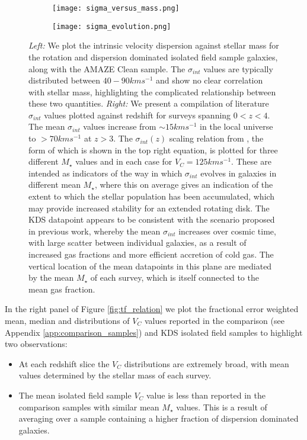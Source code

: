 \documentclass[fleqn,usenatbib]{mn2e}
\begin{document}
\begin{figure*}
    \centering \hspace{-1.3cm}
    \begin{subfigure}[h!]{0.5\textwidth}
        \centering
        \texttt{[image: sigma\_versus\_mass.png]}
    \end{subfigure} \hspace{0.4cm}
    \begin{subfigure}[h!]{0.5\textwidth}
        \centering
        \texttt{[image: sigma\_evolution.png]}
    \end{subfigure}
    \caption{{\it Left:} We plot the intrinsic velocity dispersion against stellar mass for the rotation and dispersion dominated isolated field sample galaxies, along with the AMAZE Clean sample.
    The $\sigma_{int}$ values are typically distributed between $40-90kms^{-1}$ and show no clear correlation with stellar mass, highlighting the complicated relationship between these two quantities. 
    {\it Right:} We present a compilation of literature $\sigma_{int}$ values plotted against redshift for surveys spanning $0 < z < 4$.
    The mean $\sigma_{int}$ values increase from $\sim 15kms^{-1}$ in the local universe to $> 70kms^{-1}$ at $z > 3$.
    The $\sigma_{int}(z)$ scaling relation from \protect\cite{Wisnioski2015}, the form of which is shown in the top right equation, is plotted for three different $M_{\star}$ values and in each case for $V_{C} = 125kms^{-1}$.
    These are intended as indicators of the way in which $\sigma_{int}$ evolves in galaxies in different mean $M_{\star}$, where this on average gives an indication of the extent to which the stellar population has been accumulated, which may provide increased stability for an extended rotating disk.
    The KDS datapoint appears to be consistent with the scenario proposed in previous work, whereby the mean $\sigma_{int}$ increases over cosmic time, with large scatter between individual galaxies, as a result of increased gas fractions and more efficient accretion of cold gas.
    The vertical location of the mean datapoints in this plane are mediated by the mean $M_{\star}$ of each survey, which is itself connected to the mean gas fraction.} 
    \label{fig:sigma_and_v_sigma_w_redshift}
\end{figure*}

In the right panel of Figure \ref{fig:tf_relation} we plot the fractional error weighted mean, median and distributions of $V_{C}$ values reported in the comparison (see Appendix \ref{app:comparison_samples}) and KDS isolated field samples to highlight two observations:
\begin{itemize}
    \item At each redshift slice the $V_{C}$ distributions are extremely broad, with mean values determined by the stellar mass of each survey.
    \item The mean isolated field sample $V_{C}$ value is less than reported in the comparison samples with similar mean $M_{\star}$ values.
    This is a result of averaging over a sample containing a higher fraction of dispersion dominated galaxies.
\end{itemize}
\end{document}
